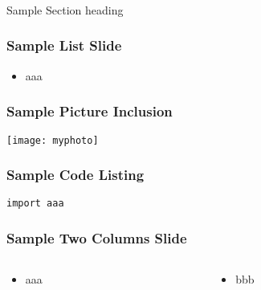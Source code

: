 \begin{frame}[fragile]\frametitle{}
\begin{center}
{\Large Sample Section heading}
\end{center}
\end{frame}


\begin{frame}[fragile]\frametitle{Sample List Slide}

\begin{itemize}
\item aaa
\end{itemize}
	  
\end{frame}

\begin{frame}[fragile]\frametitle{Sample Picture Inclusion}

\begin{center}
\texttt{[image: myphoto]}
\end{center}	  
\end{frame}

\begin{frame}[fragile] \frametitle{Sample Code Listing}
\begin{lstlisting}
import aaa
\end{lstlisting}

\end{frame}

\begin{frame}[fragile]\frametitle{Sample Two Columns Slide}
\begin{columns}
    \begin{column}[T]{0.6\linewidth}
      \begin{itemize}
		\item aaa
	  \end{itemize}

    \end{column}
    \begin{column}[T]{0.4\linewidth}
      \begin{itemize}
		\item bbb
	  \end{itemize}
    \end{column}
  \end{columns}
\end{frame}

